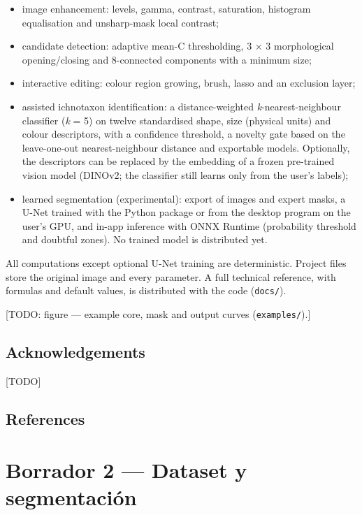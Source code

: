 \documentclass[
  10pt,
]{article}
\providecommand{\tightlist}{%
  \setlength{\itemsep}{0pt}\setlength{\parskip}{0pt}}
\begin{document}
\begin{itemize}
\tightlist
\item
  image enhancement: levels, gamma, contrast, saturation, histogram
  equalisation and unsharp-mask local contrast;
\item
  candidate detection: adaptive mean-C thresholding, 3 × 3 morphological
  opening/closing and 8-connected components with a minimum size;
\item
  interactive editing: colour region growing, brush, lasso and an
  exclusion layer;
\item
  assisted ichnotaxon identification: a distance-weighted
  \emph{k}-nearest-neighbour classifier (\emph{k} = 5) on twelve
  standardised shape, size (physical units) and colour descriptors, with
  a confidence threshold, a novelty gate based on the leave-one-out
  nearest-neighbour distance and exportable models. Optionally, the
  descriptors can be replaced by the embedding of a frozen pre-trained
  vision model (DINOv2; the classifier still learns only from the user's
  labels);
\item
  learned segmentation (experimental): export of images and expert
  masks, a U-Net trained with the Python package or from the desktop
  program on the user's GPU, and in-app inference with ONNX Runtime
  (probability threshold and doubtful zones). No trained model is
  distributed yet.
\end{itemize}

All computations except optional U-Net training are deterministic.
Project files store the original image and every parameter. A full
technical reference, with formulas and default values, is distributed
with the code (\texttt{docs/}).

{[}TODO: figure --- example core, mask and output curves
(\texttt{examples/}).{]}

\hypertarget{acknowledgements}{%
\subsection{Acknowledgements}\label{acknowledgements}}

{[}TODO{]}

\hypertarget{references}{%
\subsection{References}\label{references}}

\newpage

\hypertarget{borrador-2-dataset-y-segmentaciuxf3n}{%
\section{Borrador 2 --- Dataset y
segmentación}\label{borrador-2-dataset-y-segmentaciuxf3n}}
\end{document}
